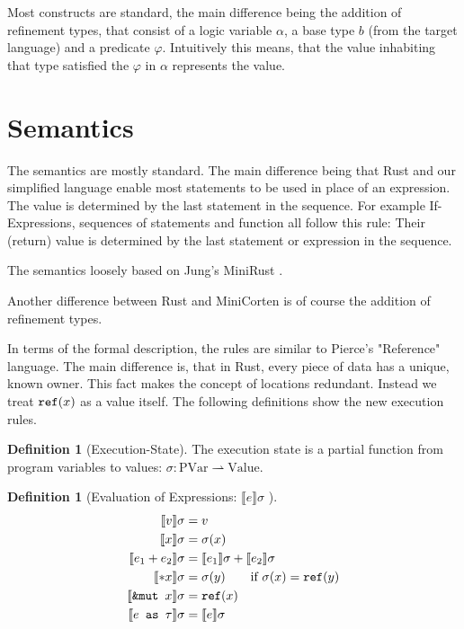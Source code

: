 \documentclass[twoside, english]{sdqthesis}
\newcommand{\bbracket}[1]{\llbracket #1 \rrbracket}
\theoremstyle{definition}
\newtheorem{definition}[theorem]{Definition}
\begin{document}
Most constructs are standard, the main difference being the addition of refinement types, that consist of a logic variable $\alpha$, a base type $b$ (from the target language) and a predicate $\varphi$. Intuitively this means, that the value inhabiting that type satisfied the $\varphi$ in $\alpha$ represents the value. 

\section{Semantics}

The semantics are mostly standard. The main difference being that Rust and our simplified language enable most statements to be used in place of an expression. The value is determined by the last statement in the sequence. For example If-Expressions, sequences of statements and function all follow this rule: Their (return) value is determined by the last statement or expression in the sequence.

The semantics loosely based on Jung's MiniRust \cite{jung_minirust_2022}.

Another difference between Rust and MiniCorten is of course the addition of refinement types.

In terms of the formal description, the rules are similar to Pierce's \cite[p. 166f]{pierce_types_2002-3} "Reference" language. %
The main difference is, that in Rust, every piece of data has a unique, known owner. This fact makes the concept of locations redundant. Instead we treat $\code{ref}(x)$ as a value itself. The following definitions show the new execution rules.

\begin{definition}[Execution-State]
  The execution state is a partial function from program variables to values: $\sigma : \text{PVar} \rightharpoonup \text{Value}$. 
\end{definition}


\begin{definition}[Evaluation of Expressions: $\bbracket{e} \sigma$ ]
  \begin{align*}
   \bbracket{v} \sigma &= v \\
   \bbracket{x} \sigma &= \sigma(x) \\
   \bbracket{e_1 + e_2} \sigma &= \bbracket{e_1} \sigma + \bbracket{e_2} \sigma \\
   \bbracket{*x} \sigma &= \sigma(y) \qquad \text{if } \sigma(x) = \code{ref}(y) \\
   \bbracket{\code{\&mut } x} \sigma &= \code{ref}(x) \\
   \bbracket{e \code{ as } \tau} \sigma &= \bbracket{e}\sigma \\
  \end{align*}
 \end{definition}
 
\end{document}
